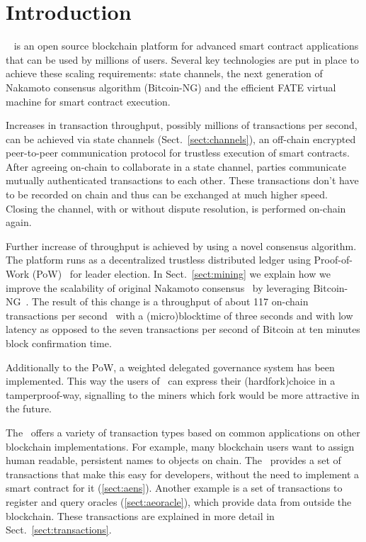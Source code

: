 \section{Introduction}

\Aet\ \cite{AE,UlfWigerCodeMesh2018} is an open source blockchain
platform for advanced smart contract applications
that can be used by millions of users. Several key technologies
are put in place to achieve these scaling requirements: state channels, the
next generation of Nakamoto consensus algorithm (Bitcoin-NG) and the
efficient FATE virtual machine for smart contract execution.

Increases in transaction throughput, possibly millions of
transactions per second, can be achieved via state channels (Sect.\
\ref{sect:channels}),
an off-chain encrypted peer-to-peer communication protocol for trustless
execution of smart contracts. After
agreeing on-chain to collaborate in a state channel, parties communicate
mutually authenticated transactions to each other. These transactions don't
have to be recorded on chain and thus can be exchanged at much higher
speed. Closing the channel, with or without dispute resolution, is performed
on-chain again.

Further increase of throughput is achieved by using a novel consensus
algorithm.
The platform runs as a decentralized trustless distributed ledger using
Proof-of-Work (PoW)~\cite{dwork1992pricing,back1997hashcash,Tromp2015CuckooCA}
for leader election.
In Sect.~\ref{sect:mining} we explain how we improve the scalability of
original Nakamoto consensus~\cite{SN} by leveraging
Bitcoin-NG~\cite{Eyal:2016:BSB:2930611.2930615}. The result of this change
is a throughput of about 117 on-chain transactions per
second~\cite{source?} with a (micro)blocktime of three seconds and with
low latency as opposed to the seven transactions per second of Bitcoin at ten
minutes block confirmation time.

Additionally to the PoW, a weighted delegated governance system has been
implemented. This way the users of \blockchain\ can express their
(hardfork)choice in a tamperproof-way, signalling to the miners which fork
would be more attractive in the future.

The \blockchain\ offers a variety of transaction types
based on common applications on other blockchain implementations.
For example, many blockchain users want to assign human readable, persistent
names to objects on chain. The \blockchain\ provides a
set of transactions that make this easy for developers, without the need to
implement a smart contract for it (\ref{sect:aens}). Another example is a set
of transactions to register and query oracles (\ref{sect:aeoracle}), which
provide data from outside the blockchain.
These transactions are explained in more detail in
Sect.~\ref{sect:transactions}.

